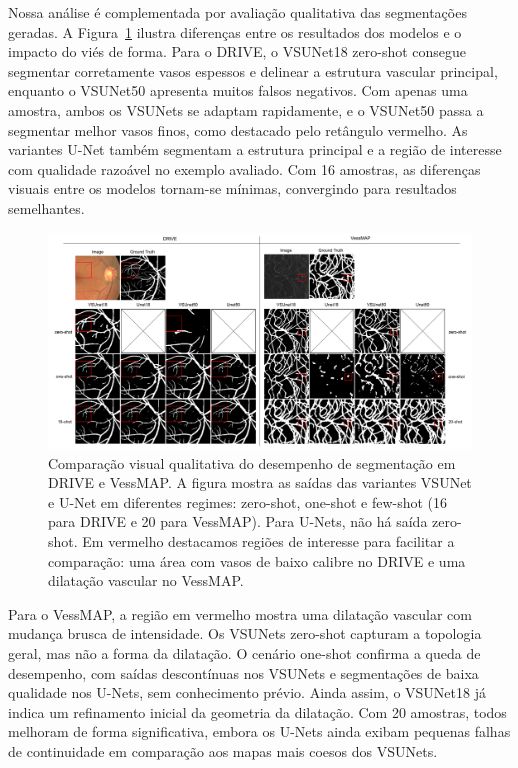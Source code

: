 \documentclass[%
reprint,
nofootinbib,
 amsmath,amssymb,
aps,
floatfix,
superscriptaddress,
showkeys,
longbibliography
]{revtex4-1}
\begin{document}
Nossa análise é complementada por avaliação qualitativa das segmentações geradas. A Figura~\ref{f:results_fewshots_drive} ilustra diferenças entre os resultados dos modelos e o impacto do viés de forma. Para o DRIVE, o VSUNet18 zero-shot consegue segmentar corretamente vasos espessos e delinear a estrutura vascular principal, enquanto o VSUNet50 apresenta muitos falsos negativos. Com apenas uma amostra, ambos os VSUNets se adaptam rapidamente, e o VSUNet50 passa a segmentar melhor vasos finos, como destacado pelo retângulo vermelho. As variantes U-Net também segmentam a estrutura principal e a região de interesse com qualidade razoável no exemplo avaliado. Com 16 amostras, as diferenças visuais entre os modelos tornam-se mínimas, convergindo para resultados semelhantes.

\begin{figure}[tbp]
    \centering
    \includegraphics[width=\textwidth]{figures/results/results_fewshots.pdf}
    \caption{Comparação visual qualitativa do desempenho de segmentação em DRIVE e VessMAP. A figura mostra as saídas das variantes VSUNet e U-Net em diferentes regimes: zero-shot, one-shot e few-shot (16 para DRIVE e 20 para VessMAP). Para U-Nets, não há saída zero-shot. Em vermelho destacamos regiões de interesse para facilitar a comparação: uma área com vasos de baixo calibre no DRIVE e uma dilatação vascular no VessMAP.}
    \label{f:results_fewshots_drive}
\end{figure}

Para o VessMAP, a região em vermelho mostra uma dilatação vascular com mudança brusca de intensidade. Os VSUNets zero-shot capturam a topologia geral, mas não a forma da dilatação. O cenário one-shot confirma a queda de desempenho, com saídas descontínuas nos VSUNets e segmentações de baixa qualidade nos U-Nets, sem conhecimento prévio. Ainda assim, o VSUNet18 já indica um refinamento inicial da geometria da dilatação. Com 20 amostras, todos melhoram de forma significativa, embora os U-Nets ainda exibam pequenas falhas de continuidade em comparação aos mapas mais coesos dos VSUNets.
\end{document}
